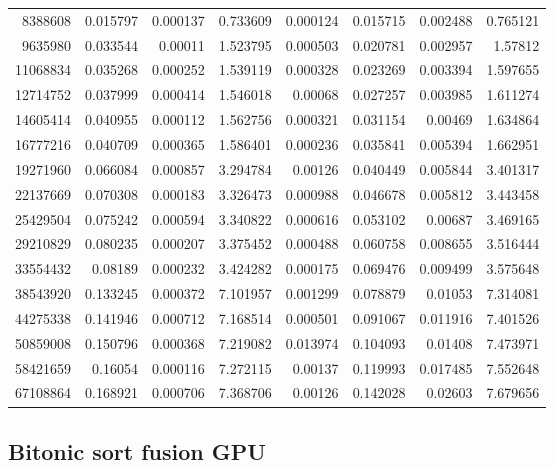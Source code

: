 \begin{longtable}{r r r r r r r r}
8388608 & 0.015797 & 0.000137 & 0.733609 & 0.000124 & 0.015715 & 0.002488 & 0.765121 \\
9635980 & 0.033544 & 0.00011 & 1.523795 & 0.000503 & 0.020781 & 0.002957 & 1.57812 \\
11068834 & 0.035268 & 0.000252 & 1.539119 & 0.000328 & 0.023269 & 0.003394 & 1.597655 \\
12714752 & 0.037999 & 0.000414 & 1.546018 & 0.00068 & 0.027257 & 0.003985 & 1.611274 \\
14605414 & 0.040955 & 0.000112 & 1.562756 & 0.000321 & 0.031154 & 0.00469 & 1.634864 \\
16777216 & 0.040709 & 0.000365 & 1.586401 & 0.000236 & 0.035841 & 0.005394 & 1.662951 \\
19271960 & 0.066084 & 0.000857 & 3.294784 & 0.00126 & 0.040449 & 0.005844 & 3.401317 \\
22137669 & 0.070308 & 0.000183 & 3.326473 & 0.000988 & 0.046678 & 0.005812 & 3.443458 \\
25429504 & 0.075242 & 0.000594 & 3.340822 & 0.000616 & 0.053102 & 0.00687 & 3.469165 \\
29210829 & 0.080235 & 0.000207 & 3.375452 & 0.000488 & 0.060758 & 0.008655 & 3.516444 \\
33554432 & 0.08189 & 0.000232 & 3.424282 & 0.000175 & 0.069476 & 0.009499 & 3.575648 \\
38543920 & 0.133245 & 0.000372 & 7.101957 & 0.001299 & 0.078879 & 0.01053 & 7.314081 \\
44275338 & 0.141946 & 0.000712 & 7.168514 & 0.000501 & 0.091067 & 0.011916 & 7.401526 \\
50859008 & 0.150796 & 0.000368 & 7.219082 & 0.013974 & 0.104093 & 0.01408 & 7.473971 \\
58421659 & 0.16054 & 0.000116 & 7.272115 & 0.00137 & 0.119993 & 0.017485 & 7.552648 \\
67108864 & 0.168921 & 0.000706 & 7.368706 & 0.00126 & 0.142028 & 0.02603 & 7.679656 \\
\end{longtable}

\subsection*{Bitonic sort fusion GPU}

